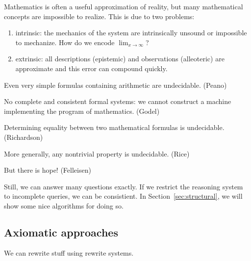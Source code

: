 \documentclass[11pt]{article}
\begin{document}
    Mathematics is often a useful approximation of reality, but many mathematical concepts are impossible to realize. This is due to two problems:

    \begin{enumerate}
        \item intrinsic: the mechanics of the system are intrinsically unsound or impossible to mechanize. How do we encode $\lim_{x \rightarrow \infty}$?
        \item extrinsic: all descriptions (epistemic) and observations (alleoteric) are approximate and this error can compound quickly.
    \end{enumerate}

    Even very simple formulas containing arithmetic are undecidable. (Peano)

    No complete and consistent formal systems: we cannot construct a machine implementing the program of mathematics. (Godel)

    Determining equality between two mathematical formulas is undecidable. (Richardson)

    More generally, any nontrivial property is undecidable. (Rice)

    But there is hope! (Felleisen)


    Still, we can answer many questions exactly. If we restrict the reasoning system to incomplete queries, we can be consistient. In Section~\ref{sec:structural}, we will show some nice algorithms for doing so.

%
%

    \subsection{Axiomatic approaches}

    We can rewrite stuff using rewrite systems.
\end{document}
